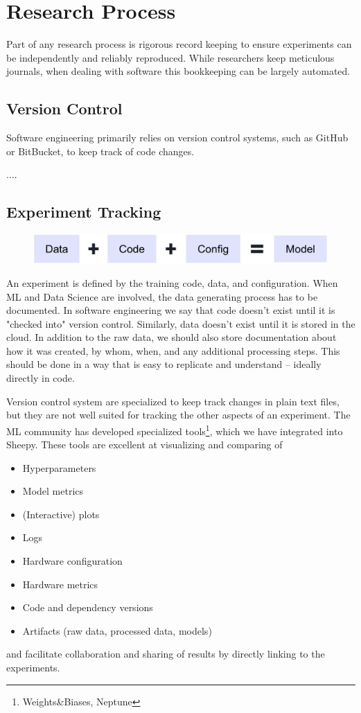 
\section{Research Process}
Part of any research process is rigorous record keeping to ensure experiments can be independently and reliably reproduced.
While researchers keep meticulous journals, when dealing with software this bookkeeping can be largely automated.


\subsection{Version Control}
Software engineering primarily relies on version control systems, such as GitHub or BitBucket, to keep track of code changes.

....

\subsection{Experiment Tracking}
\begin{figure}[h]
    \includegraphics[width=\linewidth]{chapters/NLP/figures/model.png}
    \label{fig:model}
\end{figure}
An experiment is defined by the training code, data, and configuration.
When ML and Data Science are involved, the data generating process has to be documented.
In software engineering we say that code doesn't exist until it is "checked into" version control.
Similarly, data doesn't exist until it is stored in the cloud.
In addition to the raw data, we should also store documentation about how it was created, by whom, when, and any additional processing steps.
This should be done in a way that is easy to replicate and understand -- ideally directly in code.

Version control system are specialized to keep track changes in plain text files, but they are not well suited for tracking the other aspects of an experiment.
The ML community has developed specialized tools\footnote{Weights\&Biases, Neptune}, which we have integrated into Sheepy.
These tools are excellent at visualizing and comparing of
\begin{itemize}
    \item Hyperparameters
    \item Model metrics
    \item (Interactive) plots
    \item Logs
    \item Hardware configuration
    \item Hardware metrics
    \item Code and dependency versions
    \item Artifacts (raw data, processed data, models)
\end{itemize}
and facilitate collaboration and sharing of results by directly linking to the experiments.

